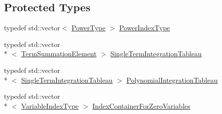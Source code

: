 \subsection*{Protected Types}
\begin{DoxyCompactItemize}
\item 
typedef std\-::vector$<$ \hyperlink{classnmr_bernstein_polynomial_line_integral_a0e07aee2cb7c5f3f5d2c1f95cd4e9abf}{Power\-Type} $>$ \hyperlink{classnmr_bernstein_polynomial_line_integral_a16dae5a5a7adabc4c3356c857aeb3841}{Power\-Index\-Type}
\item 
typedef std\-::vector\\*
$<$ \hyperlink{structnmr_bernstein_polynomial_line_integral_1_1_term_summation_element}{Term\-Summation\-Element} $>$ \hyperlink{classnmr_bernstein_polynomial_line_integral_a1d31908eb8195d1c00427f12dee7fe6b}{Single\-Term\-Integration\-Tableau}
\item 
typedef std\-::vector\\*
$<$ \hyperlink{classnmr_bernstein_polynomial_line_integral_a1d31908eb8195d1c00427f12dee7fe6b}{Single\-Term\-Integration\-Tableau} $>$ \hyperlink{classnmr_bernstein_polynomial_line_integral_a60deb00991c5e0971d60280bcbb7a405}{Polynomial\-Integration\-Tableau}
\item 
typedef std\-::vector\\*
$<$ \hyperlink{classnmr_bernstein_polynomial_line_integral_a125fa9ed7f5718e92272974aee68b27a}{Variable\-Index\-Type} $>$ \hyperlink{classnmr_bernstein_polynomial_line_integral_ad240bb2714fe8f3ce33ba2fa696931f8}{Index\-Container\-For\-Zero\-Variables}
\end{DoxyCompactItemize}
